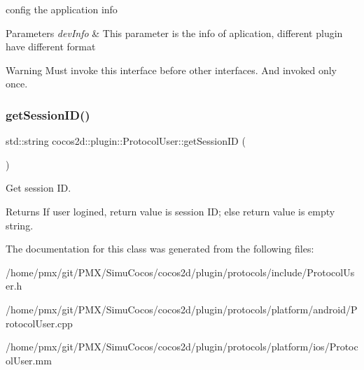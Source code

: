 config the application info 


\begin{DoxyParams}{Parameters}
{\em dev\+Info} & This parameter is the info of aplication, different plugin have different format \\
\hline
\end{DoxyParams}
\begin{DoxyWarning}{Warning}
Must invoke this interface before other interfaces. And invoked only once. 
\end{DoxyWarning}
\mbox{\label{classcocos2d_1_1plugin_1_1ProtocolUser_a3b9114b9523ed62004c65d87d542cbd7}} 
\subsubsection{\texorpdfstring{get\+Session\+I\+D()}{getSessionID()}}
{\footnotesize\ttfamily std\+::string cocos2d\+::plugin\+::\+Protocol\+User\+::get\+Session\+ID (\begin{DoxyParamCaption}{ }\end{DoxyParamCaption})}



Get session ID. 

\begin{DoxyReturn}{Returns}
If user logined, return value is session ID; else return value is empty string. 
\end{DoxyReturn}


The documentation for this class was generated from the following files\+:\begin{DoxyCompactItemize}
\item 
/home/pmx/git/\+P\+M\+X/\+Simu\+Cocos/cocos2d/plugin/protocols/include/Protocol\+User.\+h\item 
/home/pmx/git/\+P\+M\+X/\+Simu\+Cocos/cocos2d/plugin/protocols/platform/android/Protocol\+User.\+cpp\item 
/home/pmx/git/\+P\+M\+X/\+Simu\+Cocos/cocos2d/plugin/protocols/platform/ios/Protocol\+User.\+mm\end{DoxyCompactItemize}
